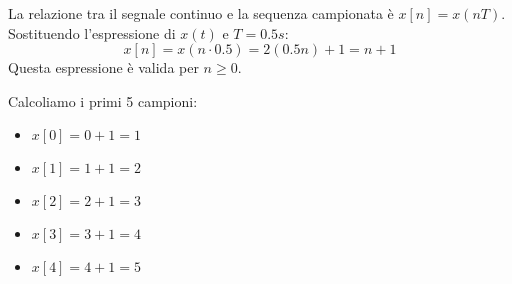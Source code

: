 
\begin{soluzione}{1}
    La relazione tra il segnale continuo e la sequenza campionata è $x[n] = x(nT)$.
    Sostituendo l'espressione di $x(t)$ e $T=0.5s$:
    \[
        x[n] = x(n \cdot 0.5) = 2(0.5n) + 1 = n + 1
    \]
    Questa espressione è valida per $n \ge 0$.
    
    Calcoliamo i primi 5 campioni:
    \begin{itemize}
        \item $x[0] = 0 + 1 = 1$
        \item $x[1] = 1 + 1 = 2$
        \item $x[2] = 2 + 1 = 3$
        \item $x[3] = 3 + 1 = 4$
        \item $x[4] = 4 + 1 = 5$
    \end{itemize}
\end{soluzione}
